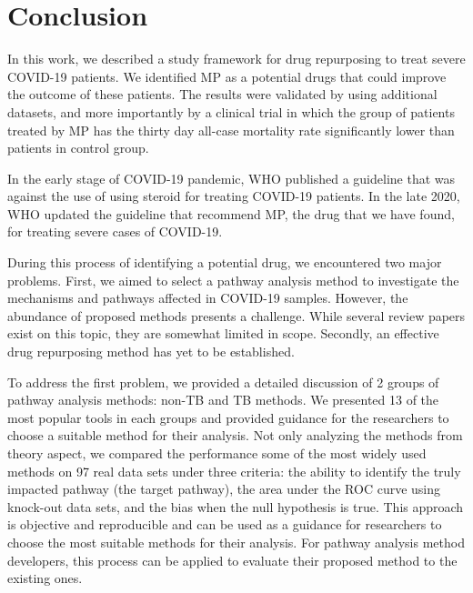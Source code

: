 \documentclass[Minh_PhD_thesis.tex]{subfiles}
\begin{document}
\section{Conclusion}

In this work, we described a study framework for drug repurposing to treat severe COVID-19 patients. We identified MP as a potential drugs that could improve the outcome of these patients. The results were validated by using additional datasets, and more importantly by a clinical trial in which the group of patients treated by MP has the thirty day all-case mortality rate significantly lower than patients in control group. 

In the early stage of COVID-19 pandemic, WHO published a guideline that was against the use of using steroid for treating COVID-19 patients. In the late 2020, WHO updated the guideline that recommend MP, the drug that we have found, for treating severe cases of COVID-19. 

During this process of identifying a potential drug, we encountered two major problems. First, we aimed to select a pathway analysis method to investigate the mechanisms and pathways affected in COVID-19 samples. However, the abundance of proposed methods presents a challenge. While several review papers exist on this topic, they are somewhat limited in scope. Secondly, an effective drug repurposing method has yet to be established.

To address the first problem, we provided a detailed discussion of 2 groups of pathway analysis methods: non-TB and TB methods. We presented 13 of the most popular tools in each groups and provided guidance for the researchers to choose a suitable method for their analysis. Not only analyzing the methods from theory aspect, we compared the performance some of the most widely used methods on 97 real data sets under three criteria: the ability to identify the truly impacted pathway (the target pathway), the area under the ROC curve using knock-out data sets, and the bias when the null hypothesis is true. This approach is objective and reproducible and can be used as a guidance for researchers to choose the most suitable methods for their analysis. For pathway analysis method developers, this process can be applied to evaluate their proposed method to the existing ones. 
\end{document}
